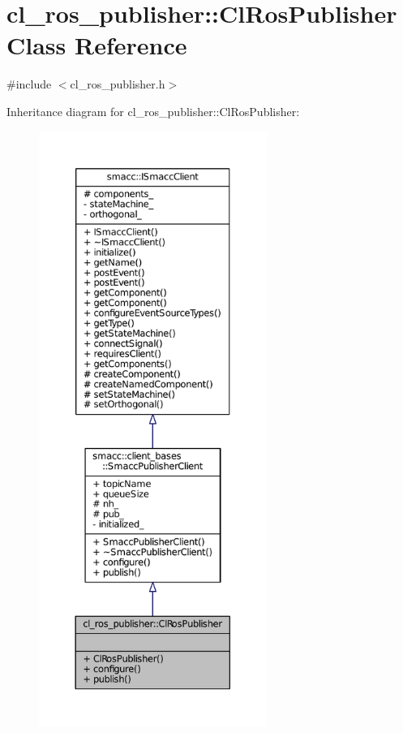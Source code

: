 \hypertarget{classcl__ros__publisher_1_1ClRosPublisher}{}\section{cl\+\_\+ros\+\_\+publisher\+:\+:Cl\+Ros\+Publisher Class Reference}
\label{classcl__ros__publisher_1_1ClRosPublisher}


{\ttfamily \#include $<$cl\+\_\+ros\+\_\+publisher.\+h$>$}



Inheritance diagram for cl\+\_\+ros\+\_\+publisher\+:\+:Cl\+Ros\+Publisher\+:
\nopagebreak
\begin{figure}[H]
\begin{center}
\leavevmode
\includegraphics[height=550pt]{classcl__ros__publisher_1_1ClRosPublisher__inherit__graph}
\end{center}
\end{figure}


